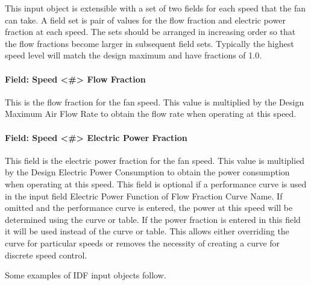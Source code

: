 This input object is extensible with a set of two fields for each speed that the fan can take.  A field set is pair of values for the flow fraction and electric power fraction at each speed. The sets should be arranged in increasing order so that the flow fractions become larger in subsequent field sets.  Typically the highest speed level will match the design maximum and have fractions of 1.0.

\paragraph{Field: Speed <\#> Flow Fraction}\label{field-speed-flow-fraction-fansysmodel}
This is the flow fraction for the fan speed. This value is multiplied by the Design Maximum Air Flow Rate to obtain the flow rate when operating at this speed.

\paragraph{Field: Speed <\#> Electric Power Fraction}\label{field-speed-power-fraction-fansysmodel}

This field is the electric power fraction for the fan speed. This value is multiplied by the Design Electric Power Consumption to obtain the power consumption when operating at this speed. This field is optional if a performance curve is used in the input field Electric Power Function of Flow Fraction Curve Name.  If omitted and the performance curve is entered, the power at this speed will be determined using the curve or table.  If the power fraction is entered in this field it will be used instead of the curve or table. This allows either overriding the curve for particular speeds or removes the necessity of creating a curve for discrete speed control.

Some examples of IDF input objects follow.


